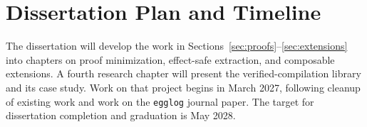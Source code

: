 \section{Dissertation Plan and Timeline}
\label{sec:timeline}

The dissertation will develop the work in Sections~\ref{sec:proofs}--\ref{sec:extensions}
  into chapters on proof minimization, effect-safe extraction, and composable extensions.
A fourth research chapter will present the verified-compilation library and its case study.
Work on that project begins in March 2027, following cleanup of existing work
  and work on the \texttt{egglog} journal paper.
The target for dissertation completion and graduation is May 2028.

